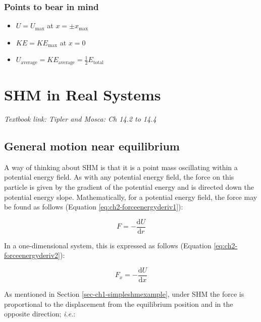 \documentclass[
]{book}
\providecommand{\tightlist}{%
  \setlength{\itemsep}{0pt}\setlength{\parskip}{0pt}}
\begin{document}
\hypertarget{points-to-bear-in-mind}{%
\subsection{Points to bear in mind}\label{points-to-bear-in-mind}}

\begin{itemize}
\tightlist
\item
  \(U = U_\mathrm{max}\) at \(x = ±x_\mathrm{max}\)
\item
  \(KE = KE_\mathrm{max}\) at \(x = 0\)
\item
  \(U_\mathrm{average} = KE_\mathrm{average} = \frac{1}{2}E_\mathrm{total}\)
\end{itemize}

\hypertarget{sec-shm-real}{%
\chapter{SHM in Real Systems}\label{sec-shm-real}}

\emph{Textbook link: Tipler and Mosca: Ch 14.2 to 14.4}

\hypertarget{general-motion-near-equilibrium}{%
\section{General motion near equilibrium}\label{general-motion-near-equilibrium}}

A way of thinking about SHM is that it is a point mass oscillating within a potential energy field. As with any potential energy field, the force on this particle is given by the gradient of the potential energy and is directed down the potential energy slope. Mathematically, for a potential energy field, the force may be found as follows (Equation \eqref{eq:ch2-forceenergyderiv1}):

\begin{equation}
F = - \frac{\mathrm{d}U}{\mathrm{d}r}
\label{eq:ch2-forceenergyderiv1}
\end{equation}

In a one-dimensional system, this is expressed as follows (Equation \eqref{eq:ch2-forceenergyderiv2}):

\begin{equation}
F_x = - \frac{\mathrm{d}U}{\mathrm{d}x}
\label{eq:ch2-forceenergyderiv2}
\end{equation}

As mentioned in Section \ref{sec-ch1-simpleshmexample}, under SHM the force is proportional to the displacement from the equilibrium position and in the opposite direction; \emph{i.e.}:
\end{document}
